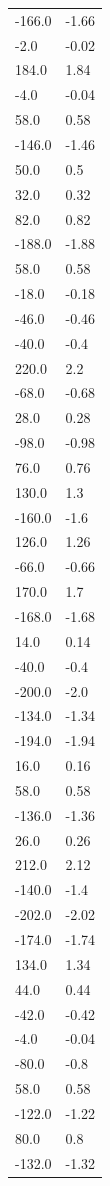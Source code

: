 \begin{longtable}{ll}
-166.0 & -1.66 \\
-2.0 & -0.02 \\
184.0 & 1.84 \\
-4.0 & -0.04 \\
58.0 & 0.58 \\
-146.0 & -1.46 \\
50.0 & 0.5 \\
32.0 & 0.32 \\
82.0 & 0.82 \\
-188.0 & -1.88 \\
58.0 & 0.58 \\
-18.0 & -0.18 \\
-46.0 & -0.46 \\
-40.0 & -0.4 \\
220.0 & 2.2 \\
-68.0 & -0.68 \\
28.0 & 0.28 \\
-98.0 & -0.98 \\
76.0 & 0.76 \\
130.0 & 1.3 \\
-160.0 & -1.6 \\
126.0 & 1.26 \\
-66.0 & -0.66 \\
170.0 & 1.7 \\
-168.0 & -1.68 \\
14.0 & 0.14 \\
-40.0 & -0.4 \\
-200.0 & -2.0 \\
-134.0 & -1.34 \\
-194.0 & -1.94 \\
16.0 & 0.16 \\
58.0 & 0.58 \\
-136.0 & -1.36 \\
26.0 & 0.26 \\
212.0 & 2.12 \\
-140.0 & -1.4 \\
-202.0 & -2.02 \\
-174.0 & -1.74 \\
134.0 & 1.34 \\
44.0 & 0.44 \\
-42.0 & -0.42 \\
-4.0 & -0.04 \\
-80.0 & -0.8 \\
58.0 & 0.58 \\
-122.0 & -1.22 \\
80.0 & 0.8 \\
-132.0 & -1.32 \\

\end{longtable}
